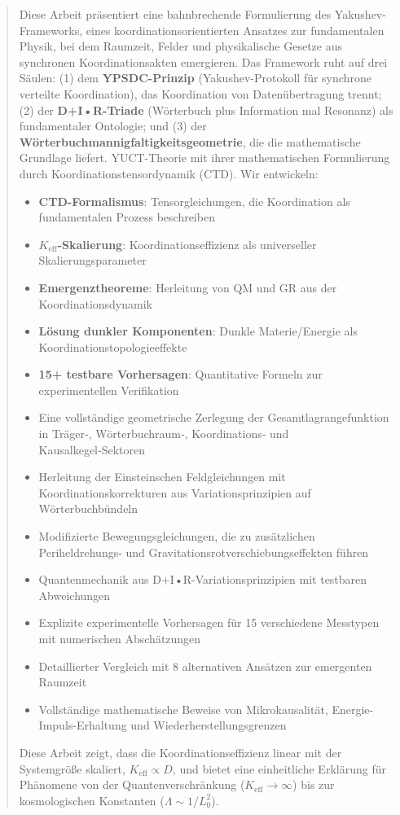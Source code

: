 \documentclass[11pt,a4paper]{article}
\begin{document}
	\begin{abstract}
		Diese Arbeit präsentiert eine bahnbrechende Formulierung des Yakushev-Frameworks, eines koordinationsorientierten Ansatzes zur fundamentalen Physik, bei dem Raumzeit, Felder und physikalische Gesetze aus synchronen Koordinationsakten emergieren. Das Framework ruht auf drei Säulen: (1) dem \textbf{YPSDC-Prinzip} (Yakushev-Protokoll für synchrone verteilte Koordination), das Koordination von Datenübertragung trennt; (2) der \textbf{D+I•R-Triade} (Wörterbuch plus Information mal Resonanz) als fundamentaler Ontologie; und (3) der \textbf{Wörterbuchmannigfaltigkeitsgeometrie}, die die mathematische Grundlage liefert. YUCT-Theorie mit ihrer mathematischen Formulierung durch Koordinationstensordynamik (CTD). Wir entwickeln:
		\begin{itemize}
			\item \textbf{CTD-Formalismus}: Tensorgleichungen, die Koordination als fundamentalen Prozess beschreiben
			\item \textbf{$K_{\mathrm{eff}}$-Skalierung}: Koordinationseffizienz als universeller Skalierungsparameter
			\item \textbf{Emergenztheoreme}: Herleitung von QM und GR aus der Koordinationsdynamik
			\item \textbf{Lösung dunkler Komponenten}: Dunkle Materie/Energie als Koordinationstopologieeffekte
			\item \textbf{15+ testbare Vorhersagen}: Quantitative Formeln zur experimentellen Verifikation
			\item Eine vollständige geometrische Zerlegung der Gesamtlagrangefunktion in Träger‑, Wörterbuchraum‑, Koordinations‑ und Kausalkegel‑Sektoren
			\item Herleitung der Einsteinschen Feldgleichungen mit Koordinationskorrekturen aus Variationsprinzipien auf Wörterbuchbündeln
			\item Modifizierte Bewegungsgleichungen, die zu zusätzlichen Periheldrehungs- und Gravitationsrotverschiebungseffekten führen
			\item Quantenmechanik aus D+I•R-Variationsprinzipien mit testbaren Abweichungen
			\item Explizite experimentelle Vorhersagen für 15 verschiedene Messtypen mit numerischen Abschätzungen
			\item Detaillierter Vergleich mit 8 alternativen Ansätzen zur emergenten Raumzeit
			\item Vollständige mathematische Beweise von Mikrokausalität, Energie-Impuls-Erhaltung und Wiederherstellungsgrenzen
		\end{itemize}
		Diese Arbeit zeigt, dass die Koordinationseffizienz linear mit der Systemgröße skaliert, $K_{\mathrm{eff}} \propto D$, und bietet eine einheitliche Erklärung für Phänomene von der Quantenverschränkung ($K_{\mathrm{eff}} \to \infty$) bis zur kosmologischen Konstanten ($\Lambda \sim 1/L_0^2$).
		

\end{abstract}
\end{document}
